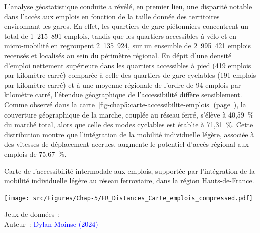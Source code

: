 \begin{refsegment}
L'analyse géostatistique conduite a révélé, en premier lieu, une disparité notable dans l'accès aux emplois en fonction de la taille donnée des territoires environnant les gares. En effet, les quartiers de gare piétonniers concentrent un total de 1~215~891 emplois, tandis que les quartiers accessibles à vélo et en micro-mobilité en regroupent 2~135~924, sur un ensemble de 2~995~421 emplois recensés et localisés au sein du périmètre régional. En dépit d'une densité d'emploi nettement supérieure dans les quartiers accessibles à pied (419 emplois par kilomètre carré) comparée à celle des quartiers de gare cyclables (191 emplois par kilomètre carré) et à une moyenne régionale de l'ordre de 94 emplois par kilomètre carré, l'étendue géographique de l'accessibilité diffère sensiblement. Comme observé dans la \hyperref[fig-chap5:carte-accessibilite-emplois]{carte~\ref{fig-chap5:carte-accessibilite-emplois}} (page~\pageref{fig-chap5:carte-accessibilite-emplois}), la couverture géographique de la marche, couplée au réseau ferré, s'élève à 40,59~\% du marché total, alors que celle des modes cyclables est établie à 71,31~\%. Cette distribution montre que l'intégration de la mobilité individuelle légère, associée à des vitesses de déplacement accrues, augmente le potentiel d'accès régional aux emplois de 75,67~\%.%

    \begin{carte}[h!]\vspace*{4pt}
        \caption{Carte de l'accessibilité intermodale aux emplois, supportée par l'intégration de la mobilité individuelle légère au réseau ferroviaire, dans la région Hauts-de-France.}
        \label{fig-chap5:carte-accessibilite-emplois}
        \centerline{\texttt{[image: src/Figures/Chap-5/FR\_Distances\_Carte\_emplois\_compressed.pdf]}}
        \vspace{5pt}
        \begin{flushright}\scriptsize{
        Jeux de données~: \textcolor{blue}{\textcite{repertoire_sirene_des_entreprises_et_de_leurs_etablissements_base_2024}}
        \\
        Auteur~: \textcolor{blue}{Dylan Moinse (2024)}
        }\end{flushright}
    \end{carte}


\end{refsegment}
